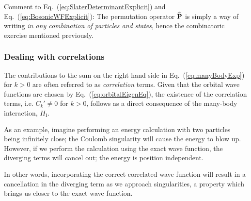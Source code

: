

Comment to Eq.~(\ref{eq:SlaterDeterminantExplicit}) and Eq.~(\ref{eq:BosonicWFExplicit}): The permutation operator ${\bf\widehat{P}}$ is simply a way of writing \textit{in any combination of particles and states}, hence the combinatoric exercise mentioned previously.

\subsubsection{Dealing with correlations}

The contributions to the sum on the right-hand side in Eq.~(\ref{eq:manyBodyExp}) for $k>0$ are often referred to as \textit{correlation} terms. Given that the orbital wave functions are chosen by Eq.~(\ref{eq:orbitalEigenEq}), the existence of the correlation terms, i.e. $C_k' \ne 0$ for $k>0$, follows as a direct consequence of the many-body interaction, $H_\mathrm{I}$.

As an example, imagine performing an energy calculation with two particles being infinitely close; the Coulomb singularity will cause the energy to blow up. However, if we perform the calculation using the exact wave function, the diverging terms will cancel out; the energy is position independent. 

In other words, incorporating the correct correlated wave function will result in a cancellation in the diverging term as we approach singularities, a property which brings us closer to the exact wave function. 

